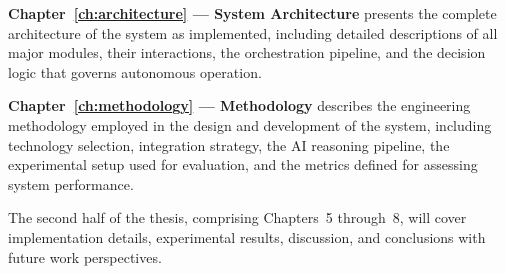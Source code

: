 \textbf{Chapter~\ref{ch:architecture} --- System Architecture} presents the complete architecture of the  system as implemented, including detailed descriptions of all major modules, their interactions, the orchestration pipeline, and the decision logic that governs autonomous operation.

\textbf{Chapter~\ref{ch:methodology} --- Methodology} describes the engineering methodology employed in the design and development of the system, including technology selection, integration strategy, the AI reasoning pipeline, the experimental setup used for evaluation, and the metrics defined for assessing system performance.

The second half of the thesis, comprising Chapters~5 through~8, will cover implementation details, experimental results, discussion, and conclusions with future work perspectives.
